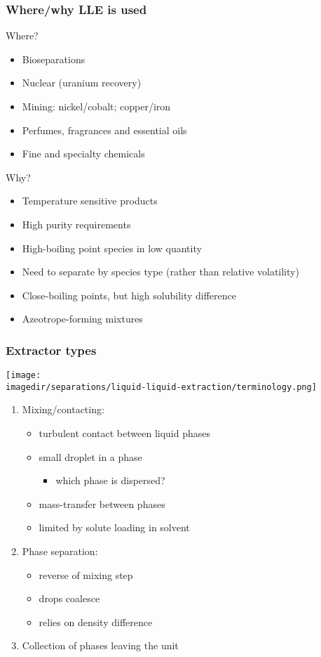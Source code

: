 \begin{frame}\frametitle{Where/why LLE is used}
	Where?
	\begin{itemize}
		\item	Bioseparations
		\item	Nuclear (uranium recovery)
		\item	Mining: nickel/cobalt; copper/iron
		\item	Perfumes, fragrances and essential oils
		\item	Fine and specialty chemicals
	\end{itemize}
	Why?
	\begin{itemize}
		\item	Temperature sensitive products
		\item	High purity requirements
		\item	High-boiling point species in low quantity
		\item	Need to separate by species type (rather than relative volatility)
		\item	Close-boiling points, but high solubility difference
		\item	Azeotrope-forming mixtures
	\end{itemize}
\end{frame}

\begin{frame}\frametitle{Extractor types}
	\begin{center}
		\texttt{[image: \\imagedir/separations/liquid-liquid-extraction/terminology.png]}
	\end{center}
	\begin{enumerate}
		\item	Mixing/contacting:
		 	\begin{itemize}
		 		\item	turbulent contact between liquid phases
		 		\item	small droplet {\color{purple}{dispersion}} in a {\color{purple}{continuous}} phase
				\begin{itemize}
					\item	which phase is dispersed?
				\end{itemize}
		 		\item	mass-transfer between phases
		 		\item	limited by solute loading in solvent
		 	\end{itemize}
		\item	Phase separation: 
			\begin{itemize}
				\item	reverse of mixing step
				\item	drops coalesce 
				\item	relies on density difference
			\end{itemize}
		\item	Collection of phases leaving the unit
	\end{enumerate}
\end{frame}

